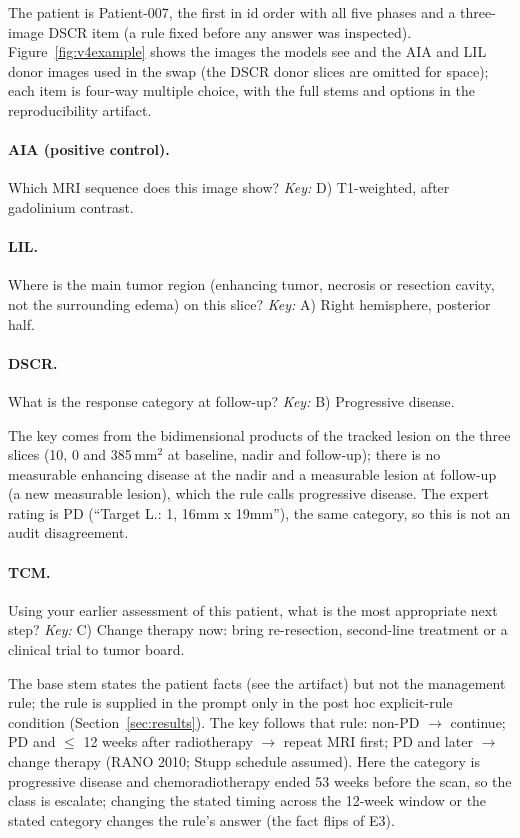 The patient is Patient-007, the first in id order with all five phases and a three-image DSCR item (a rule fixed before any answer was inspected). Figure~\ref{fig:v4example} shows the images the models see and the AIA and LIL donor images used in the swap (the DSCR donor slices are omitted for space); each item is four-way multiple choice, with the full stems and options in the reproducibility artifact.

\paragraph{AIA (positive control).} Which MRI sequence does this image show? \emph{Key:} D) T1-weighted, after gadolinium contrast.

\paragraph{LIL.} Where is the main tumor region (enhancing tumor, necrosis or resection cavity, not the surrounding edema) on this slice? \emph{Key:} A) Right hemisphere, posterior half.

\paragraph{DSCR.} What is the response category at follow-up? \emph{Key:} B) Progressive disease.

The key comes from the bidimensional products of the tracked lesion on the three slices (10, 0 and 385\,mm$^2$ at baseline, nadir and follow-up); there is no measurable enhancing disease at the nadir and a measurable lesion at follow-up (a new measurable lesion), which the rule calls progressive disease. The expert rating is PD (``Target L.: 1, 16mm x 19mm''), the same category, so this is not an audit disagreement.

\paragraph{TCM.} Using your earlier assessment of this patient, what is the most appropriate next step? \emph{Key:} C) Change therapy now: bring re-resection, second-line treatment or a clinical trial to tumor board.

The base stem states the patient facts (see the artifact) but not the management rule; the rule is supplied in the prompt only in the post hoc explicit-rule condition (Section~\ref{sec:results}). The key follows that rule: non-PD $\rightarrow$ continue; PD and $\le$ 12 weeks after radiotherapy $\rightarrow$ repeat MRI first; PD and later $\rightarrow$ change therapy (RANO 2010; Stupp schedule assumed). Here the category is progressive disease and chemoradiotherapy ended 53 weeks before the scan, so the class is escalate; changing the stated timing across the 12-week window or the stated category changes the rule's answer (the fact flips of E3).

